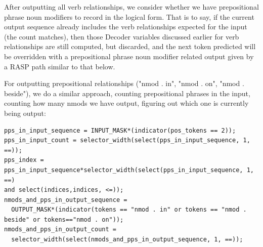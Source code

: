 \documentclass[11pt]{article}
\begin{document}
\clearpage
After outputting all verb relationships, we consider whether we have prepositional phrase noun modifiers to record in the logical form.
That is to say, if the current output sequence already includes the verb relationships expected for the input (the count matches), 
then those Decoder variables discussed earlier for verb relationships are still computed, but discarded,
and the next token predicted will be overridden with a prepositional phrase noun modifier related output given by a RASP path similar to that below.

For outputting prepositional relationships ("nmod . in", "nmod . on", "nmod . beside"), we do a similar approach, counting prepositional phrases in the input, counting how many nmods we have output, figuring out which one is currently being output:

\begin{tiny}
\begin{verbatim}
pps_in_input_sequence = INPUT_MASK*(indicator(pos_tokens == 2));
pps_in_input_count = selector_width(select(pps_in_input_sequence, 1, ==));
pps_index = pps_in_input_sequence*selector_width(select(pps_in_input_sequence, 1, ==) 
and select(indices,indices, <=));
nmods_and_pps_in_output_sequence = 
  OUTPUT_MASK*(indicator(tokens == "nmod . in" or tokens == "nmod . beside" or tokens=="nmod . on"));
nmods_and_pps_in_output_count = 
  selector_width(select(nmods_and_pps_in_output_sequence, 1, ==));
\end{verbatim}
\end{tiny}
\end{document}
